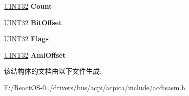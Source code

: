 \begin{DoxyCompactItemize}
\hyperlink{_processor_bind_8h_ae1e6edbbc26d6fbc71a90190d0266018}{U\+I\+N\+T32} {\bfseries Count}
\item 
\mbox{\label{structacpi__op__walk__info_ad347156ffdc04bd81362ebc107132ea2}} 
\hyperlink{_processor_bind_8h_ae1e6edbbc26d6fbc71a90190d0266018}{U\+I\+N\+T32} {\bfseries Bit\+Offset}
\item 
\mbox{\label{structacpi__op__walk__info_a465adc14e933668031d28916b8da9019}} 
\hyperlink{_processor_bind_8h_ae1e6edbbc26d6fbc71a90190d0266018}{U\+I\+N\+T32} {\bfseries Flags}
\item 
\mbox{\label{structacpi__op__walk__info_a170f593bb1e81039992653debeffcb24}} 
\hyperlink{_processor_bind_8h_ae1e6edbbc26d6fbc71a90190d0266018}{U\+I\+N\+T32} {\bfseries Aml\+Offset}
\end{DoxyCompactItemize}


该结构体的文档由以下文件生成\+:\begin{DoxyCompactItemize}
\item 
E\+:/\+React\+O\+S-\/0../drivers/bus/acpi/acpica/include/acdisasm.\+h\end{DoxyCompactItemize}
